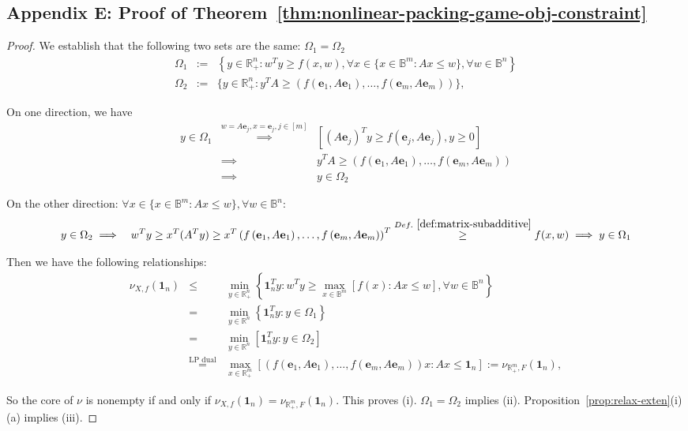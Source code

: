 \documentclass[11pt]{article}\usepackage[]{graphicx}\usepackage[]{xcolor}
\begin{document}
\subsection{Appendix E: Proof of Theorem~\ref{thm:nonlinear-packing-game-obj-constraint}}

\begin{proof} We establish that the following two sets are the same: $\Omega_1=\Omega_2$ 
\begin{eqnarray*}
\Omega_1&:=&\left\{y\in \mathbb{R}^n_{+}: w^Ty\ge f(x, w), \forall x\in \{x\in \mathbb{B}^m: Ax\le w\}, \forall w\in \mathbb{B}^n\right\}\\
\Omega_2&:=&\{y\in \mathbb{R}^n_{+}: y^TA\ge \left(f\left(\mathbf{e}_1, A\mathbf{e}_1\right),\dots, f\left(\mathbf{e}_m, A\mathbf{e}_m\right)\right)\},
\end{eqnarray*}

On one direction, we have
\begin{eqnarray*}
y\in\Omega_1&\overset{w=A\mathbf{e}_j, x=\mathbf{e}_j, j\in [m]}{\implies}& [(A\mathbf{e}_j)^Ty\ge f(\mathbf{e}_j, A\mathbf{e}_j), y\ge 0]\\
&\implies& y^TA\ge  \left(f\left(\mathbf{e}_1, A\mathbf{e}_1\right),\dots, f\left(\mathbf{e}_m, A\mathbf{e}_m\right)\right)\\
&\implies& y\in \Omega_2
\end{eqnarray*}

On the other direction: $\forall x\in \{x\in \mathbb{B}^m: Ax\le w\}, \forall w\in\mathbb{B}^n$:
\begin{eqnarray*}
y\in\Omega_2&\implies& w^Ty\ge x^T(A^Ty)\ge x^T\left(f\left(\mathbf{e}_1, A\mathbf{e}_1\right),\dots, f\left(\mathbf{e}_m, A\mathbf{e}_m\right)\right)^T\overset{Def.~\ref{def:matrix-subadditive}}{\ge} f(x, w)\implies y\in \Omega_1
\end{eqnarray*}

Then we have the following relationships:  
\begin{eqnarray*}
\nonumber \nu_{X, f}\left(\mathbf{1}_n\right)&\le&\min\limits_{y\in\mathbb{R}^{n}_{+}}\left\{\mathbf{1}_n^Ty: w^Ty\ge \max\limits_{x\in \mathbb{B}^m}\left[f(x): Ax\le w \right], \forall w\in \mathbb{B}^n\right\}\\
\nonumber&=&\min\limits_{y\in\mathbb{R}^{n}}\left\{\mathbf{1}_n^Ty: y\in \Omega_1\right\}\\
&=&\min\limits_{y\in\mathbb{R}^{n}} \left[\mathbf{1}_n^Ty: y\in \Omega_2\right]\\
\nonumber&\overset{\text{LP dual}}{=}&\max\limits_{x\in \mathbb{R}^m_{+}} \left[(f(\mathbf{e}_1, A\mathbf{e}_1),\dots, f(\mathbf{e}_m, A\mathbf{e}_m))x: Ax\le \mathbf{1}_n\right]:=\nu_{\mathbb{R}^m_{+}, F}\left(\mathbf{1}_n\right),
\end{eqnarray*}

So the core of $\nu$ is nonempty if and only if $\nu_{X, f}\left(\mathbf{1}_n\right)=\nu_{\mathbb{R}^m_{+}, F}\left(\mathbf{1}_n\right)$. This proves (i).  $\Omega_1=\Omega_2$ implies (ii). Proposition~\ref{prop:relax-exten}(i)(a) implies (iii).  
\end{proof}
\end{document}
